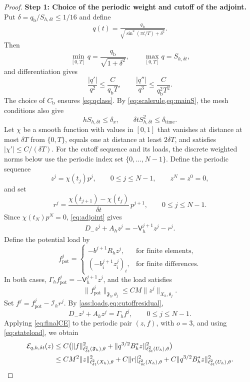 \documentclass[print,wide,eng]{draft}
\begin{document}
\begin{proof}
\textbf{Step 1: Choice of the periodic weight and cutoff of the adjoint.}
Put $\delta=q_{\mathrm b}/S_{h,\delta t}\le1/16$ and define
%
\begin{align}\label{eq:physical-weight}
q(t)=\frac{q_{\mathrm b}}{\sqrt{\sin^2(\pi t/T)+\delta^2}}.
\end{align}
%
Then
%
$$
\min_{[0,T]}q=\frac{q_{\mathrm b}}{\sqrt{1+\delta^2}},
\qquad
\max_{[0,T]}q=S_{h,\delta t},
$$
%
and differentiation gives
%
$$
\frac{|q'|}{q^2}\le\frac{C}{q_{\mathrm b}T},\qquad
\frac{|q''|}{q^3}\le\frac{C}{q_{\mathrm b}^2T^2}.
$$
%
The choice of $C_{\mathrm b}$ ensures \cref{eq:qclass}. By \cref{eq:scalerule,eq:mainS}, the mesh conditions also give
%
$$
hS_{h,\delta t}\le\delta_x,\qquad
\delta t S_{h,\delta t}^2\le\delta_{\mathrm{time}}.
$$
%
Let $\chi$ be a smooth function with values in $[0,1]$ that vanishes at distance at most $\delta T$ from $\{0,T\}$, equals one at distance at least $2\delta T$, and satisfies $|\chi'|\le C/(\delta T)$. For the cutoff sequence and its loads, the discrete weighted norms below use the periodic index set $\{0,\ldots,N-1\}$. Define the periodic sequence
%
$$
z^j=\chi(t_j)p^j,\qquad 0\le j\le N-1,\qquad z^N=z^0=0,
$$
%
and set
%
$$
r^j=\frac{\chi(t_{j+1})-\chi(t_j)}{\delta t}\,p^{j+1},\qquad 0\le j\le N-1.
$$
%
Since $\chi(t_N)p^N=0$, \cref{eq:adjoint} gives
%
\begin{align}\label{eq:cutoffresidual}
D_-z^j+A_hz^j
=-\mathsf V_h^{j+1}z^j-r^j.
\end{align}
%
Define the potential load by
%
$$
f_{\mathrm{pot}}^j=
\begin{cases}
-b^{j+1}R_hz^j, &\text{for finite elements},\\[2pt]
(-b_i^{j+1}z_i^j)_i, &\text{for finite differences}.
\end{cases}
$$
%
In both cases, $\Gamma_hf_{\mathrm{pot}}^j=-\mathsf V_h^{j+1}z^j$, and the load satisfies
%
$$
\|f_{\mathrm{pot}}^j\|_{\mathfrak F_h,\theta_j}\le CM\|z^j\|_{X_h,\theta_j}.
$$
%
Set $f^j=f_{\mathrm{pot}}^j-\mathcal I_hr^j$. By \cref{ass:loads,eq:cutoffresidual},
%
$$
D_-z^j+A_hz^j=\Gamma_hf^j,\qquad 0\le j\le N-1.
$$
%
Applying \cref{eq:finalCE} to the periodic pair $(z,f)$, with $o=3$, and using \cref{eq:stateload}, we obtain
%
\begin{align}\label{eq:cutoff-carleman}
\mathcal E_{q,h,\delta t}(z)
&\le C\bigl(\|f\|_{\ell_{\delta t}^2(\mathfrak F_h),\theta}^2
+\|q^{3/2}B_h^*z\|_{\ell_{\delta t}^2(U_h),\theta}^2\bigr)\notag\\
&\le CM^2\|z\|_{\ell_{\delta t}^2(X_h),\theta}^2
+C\|r\|_{\ell_{\delta t}^2(X_h),\theta}^2
+C\|q^{3/2}B_h^*z\|_{\ell_{\delta t}^2(U_h),\theta}^2.
\end{align}
%


\end{proof}
\end{document}
